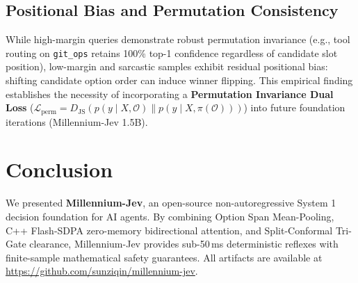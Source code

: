 \documentclass[11pt,a4paper]{article}
\begin{document}
\subsection{Positional Bias and Permutation Consistency}
While high-margin queries demonstrate robust permutation invariance (e.g., tool routing on \texttt{git\_ops} retains 100\% top-1 confidence regardless of candidate slot position), low-margin and sarcastic samples exhibit residual positional bias: shifting candidate option order can induce winner flipping. This empirical finding establishes the necessity of incorporating a \textbf{Permutation Invariance Dual Loss} ($\mathcal{L}_{\text{perm}} = D_{\text{JS}}(p(y \mid X, \mathcal{O}) \parallel p(y \mid X, \pi(\mathcal{O})))$) into future foundation iterations (Millennium-Jev 1.5B).

\section{Conclusion}
We presented \textbf{Millennium-Jev}, an open-source non-autoregressive System 1 decision foundation for AI agents. By combining Option Span Mean-Pooling, C++ Flash-SDPA zero-memory bidirectional attention, and Split-Conformal Tri-Gate clearance, Millennium-Jev provides sub-50\,ms deterministic reflexes with finite-sample mathematical safety guarantees. All artifacts are available at \url{https://github.com/sunziqin/millennium-jev}.
\end{document}
